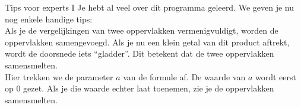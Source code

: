 \begin{surferPage}{Tips voor experts I}
Je hebt al veel over dit programma geleerd. We geven je nu nog enkele handige tips:\\
\vspace{0.3cm}
Als je de vergelijkingen van twee oppervlakken vermenigvuldigt, worden de oppervlakken samengevoegd. Als je nu een klein getal van dit product aftrekt, wordt de doorsnede iets ``gladder''. Dit betekent dat de twee oppervlakken samensmelten.\\
\vspace{0.3cm}
Hier trekken we de parameter $a$ van de formule af. De waarde van $a$ wordt eerst op 0 gezet. Als je die waarde echter laat toenemen, zie je de oppervlakken samensmelten.
\end{surferPage}
